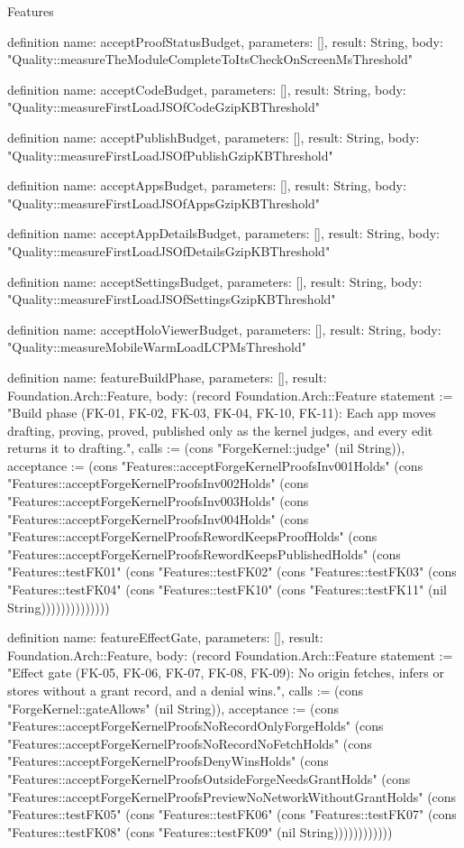 \begin{lexlean}{Features}
\begin{semanticmodule}
definition{
  name: acceptProofStatusBudget,
  parameters: [],
  result: String,
  body: "Quality::measureTheModuleCompleteToItsCheckOnScreenMsThreshold"
}

definition{
  name: acceptCodeBudget,
  parameters: [],
  result: String,
  body: "Quality::measureFirstLoadJSOfCodeGzipKBThreshold"
}

definition{
  name: acceptPublishBudget,
  parameters: [],
  result: String,
  body: "Quality::measureFirstLoadJSOfPublishGzipKBThreshold"
}

definition{
  name: acceptAppsBudget,
  parameters: [],
  result: String,
  body: "Quality::measureFirstLoadJSOfAppsGzipKBThreshold"
}

definition{
  name: acceptAppDetailsBudget,
  parameters: [],
  result: String,
  body: "Quality::measureFirstLoadJSOfDetailsGzipKBThreshold"
}

definition{
  name: acceptSettingsBudget,
  parameters: [],
  result: String,
  body: "Quality::measureFirstLoadJSOfSettingsGzipKBThreshold"
}

definition{
  name: acceptHoloViewerBudget,
  parameters: [],
  result: String,
  body: "Quality::measureMobileWarmLoadLCPMsThreshold"
}

definition{
  name: featureBuildPhase,
  parameters: [],
  result: Foundation.Arch::Feature,
  body: (record Foundation.Arch::Feature {statement := "Build phase (FK-01, FK-02, FK-03, FK-04, FK-10, FK-11): Each app moves drafting, proving, proved, published only as the kernel judges, and every edit returns it to drafting.", calls := (cons "ForgeKernel::judge" (nil String)), acceptance := (cons "Features::acceptForgeKernelProofsInv001Holds" (cons "Features::acceptForgeKernelProofsInv002Holds" (cons "Features::acceptForgeKernelProofsInv003Holds" (cons "Features::acceptForgeKernelProofsInv004Holds" (cons "Features::acceptForgeKernelProofsRewordKeepsProofHolds" (cons "Features::acceptForgeKernelProofsRewordKeepsPublishedHolds" (cons "Features::testFK01" (cons "Features::testFK02" (cons "Features::testFK03" (cons "Features::testFK04" (cons "Features::testFK10" (cons "Features::testFK11" (nil String)))))))))))))})
}

definition{
  name: featureEffectGate,
  parameters: [],
  result: Foundation.Arch::Feature,
  body: (record Foundation.Arch::Feature {statement := "Effect gate (FK-05, FK-06, FK-07, FK-08, FK-09): No origin fetches, infers or stores without a grant record, and a denial wins.", calls := (cons "ForgeKernel::gateAllows" (nil String)), acceptance := (cons "Features::acceptForgeKernelProofsNoRecordOnlyForgeHolds" (cons "Features::acceptForgeKernelProofsNoRecordNoFetchHolds" (cons "Features::acceptForgeKernelProofsDenyWinsHolds" (cons "Features::acceptForgeKernelProofsOutsideForgeNeedsGrantHolds" (cons "Features::acceptForgeKernelProofsPreviewNoNetworkWithoutGrantHolds" (cons "Features::testFK05" (cons "Features::testFK06" (cons "Features::testFK07" (cons "Features::testFK08" (cons "Features::testFK09" (nil String)))))))))))})
}


\end{semanticmodule}
\end{lexlean}

